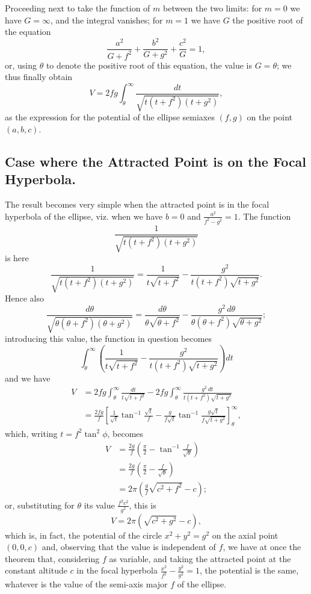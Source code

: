 \documentclass[11pt,a4paper]{book}
\begin{document}
\begin{art}
Proceeding next to take the function of $m$ between the two limits: for $m=0$ we have $G=\infty$, and the integral vanishes; for $m=1$ we have $G$ the positive root of the equation
\[
\frac{a^2}{G + f^2} + \frac{b^2}{G + g^2} + \frac{c^2}{G} = 1,
\]
or, using $\theta$ to denote the positive root of this equation, the value is $G = \theta$; we thus finally obtain
\[
V = 2fg\int_{\theta}^{\infty} \frac{dt}{\sqrt{t(t + f^2)(t + g^2)}},
\]
as the expression for the potential of the ellipse semiaxes $(f,g)$ on the point $(a,b,c)$.
\end{art}

\subsection*{Case where the Attracted Point is on the Focal Hyperbola.}

\begin{art}
The result becomes very simple when the attracted point is in the focal hyperbola of the ellipse, viz. when we have $b=0$ and $\frac{a^2}{f^2 - g^2} = 1$. The function
\[
\frac{1}{\sqrt{t(t + f^2)(t + g^2)}}
\]
is here
\[
\frac{1}{\sqrt{t(t + f^2)(t + g^2)}} = \frac{1}{t\sqrt{t + f^2}} - \frac{g^2}{t(t + f^2)\sqrt{t + g^2}}.
\]
Hence also
\[
\frac{d\theta}{\sqrt{\theta(\theta + f^2)(\theta + g^2)}} = \frac{d\theta}{\theta\sqrt{\theta + f^2}} - \frac{g^2\,d\theta}{\theta(\theta + f^2)\sqrt{\theta + g^2}};
\]
introducing this value, the function in question becomes
\[
\int_{\theta}^{\infty} \left(\frac{1}{t\sqrt{t + f^2}} - \frac{g^2}{t(t + f^2)\sqrt{t + g^2}}\right) dt
\]
and we have
\begin{align*}
V &= 2fg\int_{\theta}^{\infty} \frac{dt}{t\sqrt{t + f^2}} - 2fg\int_{\theta}^{\infty} \frac{g^2\,dt}{t(t + f^2)\sqrt{t + g^2}} \\
&= \frac{2fg}{f}\left[\frac{1}{\sqrt{t}}\tan^{-1}\frac{\sqrt{t}}{f} - \frac{g}{f\sqrt{t}}\tan^{-1}\frac{g\sqrt{t}}{f\sqrt{t + g^2}}\right]_{\theta}^{\infty},
\end{align*}
which, writing $t = f^2\tan^2\phi$, becomes
\begin{align*}
V &= \frac{2g}{f}\left(\frac{\pi}{2} - \tan^{-1}\frac{f}{\sqrt{\theta}}\right) \\
&= \frac{2g}{f}\left(\frac{\pi}{2} - \frac{f}{\sqrt{\theta}}\right) \\
&= 2\pi\left(\frac{g}{f}\sqrt{c^2 + f^2} - c\right);
\end{align*}
or, substituting for $\theta$ its value $\frac{f^2c^2}{g^2}$, this is
\[
V = 2\pi(\sqrt{c^2 + g^2} - c),
\]
which is, in fact, the potential of the circle $x^2 + y^2 = g^2$ on the axial point $(0, 0, c)$ and, observing that the value is independent of $f$, we have at once the theorem that, considering $f$ as variable, and taking the attracted point at the constant altitude $c$ in the focal hyperbola $\frac{x^2}{f^2} - \frac{y^2}{g^2} = 1$, the potential is the same, whatever is the value of the semi-axis major $f$ of the ellipse.
\end{art}
\end{document}
